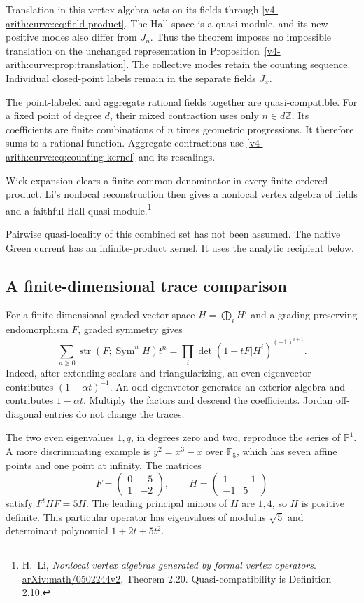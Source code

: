 Translation in this vertex algebra acts on its fields through
\eqref{v4-arith:curve:eq:field-product}. The Hall space is a
quasi-module, and its new positive modes also differ from $J_n$.
Thus the theorem imposes no impossible translation on the
unchanged representation in
Proposition~\ref{v4-arith:curve:prop:translation}.
The collective modes retain the counting sequence. Individual
closed-point labels remain in the separate fields $J_x$.

The point-labeled and aggregate rational fields together are
quasi-compatible. For a fixed point of degree $d$, their mixed
contraction uses only $n\in d\mathbb Z$. Its coefficients are
finite combinations of $n$ times geometric progressions.
It therefore sums to a rational function. Aggregate contractions
use \eqref{v4-arith:curve:eq:counting-kernel} and its rescalings.

Wick expansion clears a finite common denominator in every finite
ordered product. Li's nonlocal reconstruction then gives a
nonlocal vertex algebra of fields and a faithful Hall
quasi-module.\footnote{H.~Li, \emph{Nonlocal vertex algebras
generated by formal vertex operators}.
\href{https://arxiv.org/abs/math/0502244v2}{arXiv:math/0502244v2},
Theorem 2.20. Quasi-compatibility is Definition 2.10.}

Pairwise quasi-locality of this combined set has not been assumed.
The native Green current has an infinite-product kernel.
It uses the analytic recipient below.

\subsection{A finite-dimensional trace comparison}

For a finite-dimensional graded vector space $H=\bigoplus_iH^i$
and a grading-preserving endomorphism $F$, graded symmetry gives
\[
 \sum_{n\geq0}\operatorname{str}(F;\operatorname{Sym}^nH)t^n
 =\prod_i\det(1-tF|H^i)^{(-1)^{i+1}}.
\]
Indeed, after extending scalars and triangularizing, an even
eigenvector contributes $(1-\alpha t)^{-1}$. An odd eigenvector
generates an exterior algebra and contributes $1-\alpha t$.
Multiply the factors and descend the coefficients. Jordan
off-diagonal entries do not change the traces.

The two even eigenvalues $1,q$, in degrees zero and two, reproduce
the series of $\mathbb P^1$. A more discriminating example is
$y^2=x^3-x$ over $\mathbb F_5$, which has seven affine points
and one point at infinity. The matrices
\[
 F=\begin{pmatrix}0&-5\\1&-2\end{pmatrix},
 \qquad H=\begin{pmatrix}1&-1\\-1&5\end{pmatrix}
\]
satisfy $F^tHF=5H$. The leading principal minors of $H$ are
$1,4$, so $H$ is positive definite. This particular operator
has eigenvalues of modulus $\sqrt5$ and determinant polynomial
$1+2t+5t^2$.

